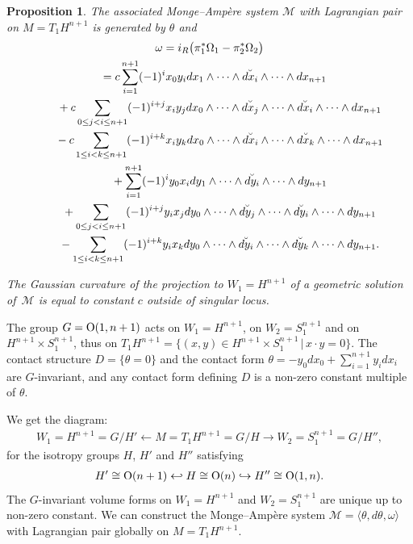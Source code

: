 \documentclass[pdftex]{sigma}
\newtheorem{Prop}[Th]{Proposition}
\begin{document}
\begin{Prop}
The associated Monge--Amp{\`e}re system $\mathcal{M}$
with Lagrangian pair on $M=T_1H^{n+1}$
is generated by $\theta$ and
\begin{gather*}
\omega    =
i_R \big({\pi}_1^*{\Omega}_1-{\pi}_2^*{\Omega}_2\big)\\
\hphantom{\omega}{} =
c \sum_{i=1}^{n+1} (-1)^{i} x_0y_i
dx_1 \wedge \cdots \wedge \breve{dx_i} \wedge
\cdots \wedge dx_{n+1}
\\
\hphantom{\omega=}{}
+ c \sum_{0 \leq j  < i \leq n+1} (-1)^{i+j} x_iy_j
dx_0 \wedge \cdots \wedge \breve{dx_j} \wedge \cdots \wedge
\breve{dx_i}
\wedge \cdots \wedge dx_{n+1}
\\
\hphantom{\omega=}{} -  c \sum_{1 \leq i  <  k \leq n+1} (-1)^{i+k} x_iy_k
dx_0 \wedge \cdots \wedge \breve{dx_i} \wedge \cdots \wedge
\breve{dx_k}
\wedge \cdots \wedge dx_{n+1}
\\
\hphantom{\omega=}{}
+ \sum_{i=1}^{n+1} (-1)^{i} y_0x_i
dy_1 \wedge \cdots \wedge \breve{dy_i} \wedge
\cdots \wedge dy_{n+1}
\\
\hphantom{\omega=}{}  +
\sum_{0 \leq j  < i \leq n+1} (-1)^{i+j} y_ix_j
dy_0 \wedge \cdots \wedge \breve{dy_j} \wedge \cdots \wedge
\breve{dy_i}
\wedge \cdots \wedge dy_{n+1} \\
\hphantom{\omega=}{} -
\sum_{1 \leq i < k \leq n+1} (-1)^{i+k} y_ix_k
dy_0 \wedge \cdots \wedge \breve{dy_i} \wedge \cdots \wedge
\breve{dy_k}
\wedge \cdots \wedge dy_{n+1}.
\end{gather*}


The Gaussian curvature
of the projection to $W_1=H^{n+1}$ of a geometric solution
of~$\mathcal{M}$
is equal to constant $c$ outside of singular locus.
\end{Prop}


\begin{Rem}
The group $G = {\rm O}(1,n+1)$ acts on $W_1=H^{n+1}$, on $W_2=S_1^{n+1}$
and on $H^{n+1}\times S_1^{n+1}$, thus on
$T_1H^{n+1} = \{ (x, y) \in H^{n+1}\times S_1^{n+1} \,|\, x\cdot y = 0\}$.
The contact structure $D = \{ \theta = 0\}$ and the contact form
$\theta = - y_0 dx_0 + \sum\limits_{i=1}^{n+1} y_i dx_i$ are $G$-invariant, and
any contact form def\/ining $D$ is a non-zero constant multiple of $\theta$.

We get the diagram:
\begin{gather*}
W_1=H^{n+1} = G/H' \leftarrow M=T_1H^{n+1} = G/H
\rightarrow W_2=S_1^{n+1} = G/H'',
\end{gather*}
for the isotropy groups $H$, $H'$ and $H''$ satisfying
\begin{gather*}
H' \cong {\rm O}(n+1) \hookleftarrow H \cong {\rm O}(n)
\hookrightarrow H'' \cong {\rm O}(1,n).
\end{gather*}
The $G$-invariant volume forms on $W_1=H^{n+1}$ and $W_2=S_1^{n+1}$
are unique up to non-zero constant.
We can construct
the Monge--Amp{\`e}re system $\mathcal{M}=
\langle \theta, d\theta, \omega \rangle $
with Lagrangian pair globally on $M=T_1H^{n+1}$.
\end{Rem}
\end{document}
